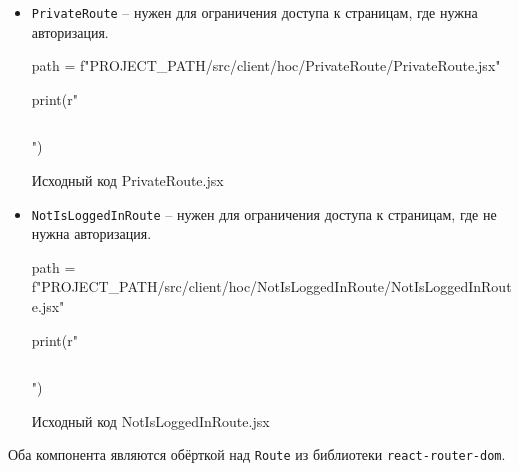 \begin{itemize}
    \item \texttt{PrivateRoute} -- нужен для ограничения доступа к страницам, где нужна авторизация.

\begin{listing}[H]
\begin{pycode}
path = f"{PROJECT_PATH}/src/client/hoc/PrivateRoute/PrivateRoute.jsx"

print(r"\inputminted{jsx}{" + path + r"}")
\end{pycode}
\caption{Исходный код PrivateRoute.jsx}
\end{listing}
    
    \item \texttt{NotIsLoggedInRoute} -- нужен для ограничения доступа к страницам, где не нужна авторизация.

\begin{listing}[H]
\begin{pycode}
path = f"{PROJECT_PATH}/src/client/hoc/NotIsLoggedInRoute/NotIsLoggedInRoute.jsx"

print(r"\inputminted{jsx}{" + path + r"}")
\end{pycode}
\caption{Исходный код NotIsLoggedInRoute.jsx}
\end{listing}

\end{itemize}

Оба компонента являются обёрткой над \texttt{Route} из библиотеки \texttt{react-router-dom}.

